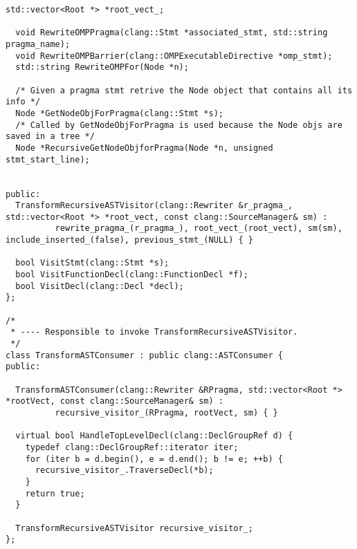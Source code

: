 \documentclass[a4paper,10pt,twoside]{book}
\begin{document}
\begin{lstlisting}[language=CCC, caption=driver/program.h]
  std::vector<Root *> *root_vect_;

  void RewriteOMPPragma(clang::Stmt *associated_stmt, std::string pragma_name);
  void RewriteOMPBarrier(clang::OMPExecutableDirective *omp_stmt);
  std::string RewriteOMPFor(Node *n);
  
  /* Given a pragma stmt retrive the Node object that contains all its info */
  Node *GetNodeObjForPragma(clang::Stmt *s);
  /* Called by GetNodeObjForPragma is used because the Node objs are saved in a tree */
  Node *RecursiveGetNodeObjforPragma(Node *n, unsigned stmt_start_line);


public:
  TransformRecursiveASTVisitor(clang::Rewriter &r_pragma_, std::vector<Root *> *root_vect, const clang::SourceManager& sm) : 
          rewrite_pragma_(r_pragma_), root_vect_(root_vect), sm(sm), include_inserted_(false), previous_stmt_(NULL) { }
  
  bool VisitStmt(clang::Stmt *s);
  bool VisitFunctionDecl(clang::FunctionDecl *f);
  bool VisitDecl(clang::Decl *decl);
};

/*
 * ---- Responsible to invoke TransformRecursiveASTVisitor.
 */
class TransformASTConsumer : public clang::ASTConsumer { 
public:

  TransformASTConsumer(clang::Rewriter &RPragma, std::vector<Root *> *rootVect, const clang::SourceManager& sm) : 
          recursive_visitor_(RPragma, rootVect, sm) { }
  
  virtual bool HandleTopLevelDecl(clang::DeclGroupRef d) {
    typedef clang::DeclGroupRef::iterator iter;
    for (iter b = d.begin(), e = d.end(); b != e; ++b) {
      recursive_visitor_.TraverseDecl(*b);
    } 
    return true; 
  }

  TransformRecursiveASTVisitor recursive_visitor_;
};
\end{lstlisting}
\end{document}
